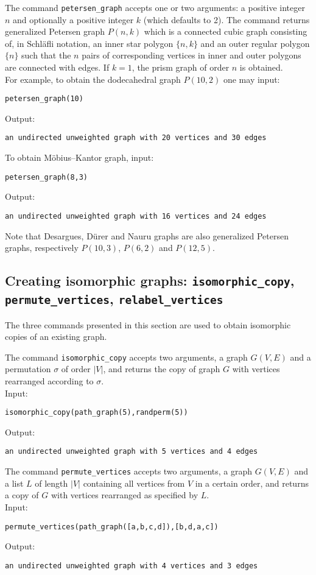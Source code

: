 \documentclass[a4paper,11pt]{article}
\begin{document}
The command {\tt petersen\_graph} accepts one or two arguments: a positive integer $ n $ and optionally a positive integer $ k $ (which defaults to 2). The command returns generalized Petersen graph $ P(n,k) $ which is a connected cubic graph consisting of, in Schl\"afli notation, an inner star polygon $ \{n,k\} $ and an outer regular polygon $ \{n\} $ such that the $ n  $ pairs of corresponding vertices in inner and outer polygons are connected with edges. If $ k=1 $, the prism graph of order $ n $ is obtained.\\
For example, to obtain the dodecahedral graph $ P(10,2) $ one may input:
\begin{center}
  \tt petersen\_graph(10)
\end{center}
Output:
\begin{center}
  \tt an undirected unweighted graph with 20 vertices and 30 edges
\end{center}
To obtain M\"obius--Kantor graph, input:
\begin{center}
  \tt petersen\_graph(8,3)
\end{center}
Output:
\begin{center}
  \tt an undirected unweighted graph with 16 vertices and 24 edges
\end{center}
Note that Desargues, D\"urer and Nauru graphs are also generalized Petersen graphs, respectively $ P(10,3) $, $ P(6,2) $ and $ P(12,5) $.

\subsection{Creating isomorphic graphs: {\tt isomorphic\_copy}, {\tt permute\_vertices}, {\tt relabel\_vertices}}

The three commands presented in this section are used to obtain isomorphic copies of an existing graph. 

The command {\tt isomorphic\_copy} accepts two arguments, a graph $ G(V,E) $ and a permutation $ \sigma $ of order $ |V| $, and returns the copy of graph $ G $ with vertices rearranged according to $ \sigma $.\\
Input:
\begin{center}
  \tt isomorphic\_copy(path\_graph(5),randperm(5))
\end{center}
Output:
\begin{center}
  \tt an undirected unweighted graph with 5 vertices and 4 edges
\end{center}

The command {\tt permute\_vertices} accepts two arguments, a graph $ G(V,E) $ and a list $ L $ of length $ |V| $ containing all vertices from $ V $ in a certain order, and returns a copy of $ G $ with vertices rearranged as specified by $ L $.\\
Input:
\begin{center}
  \tt permute\_vertices(path\_graph([a,b,c,d]),[b,d,a,c])
\end{center}
Output:
\begin{center}
  \tt an undirected unweighted graph with 4 vertices and 3 edges
\end{center}
\end{document}
